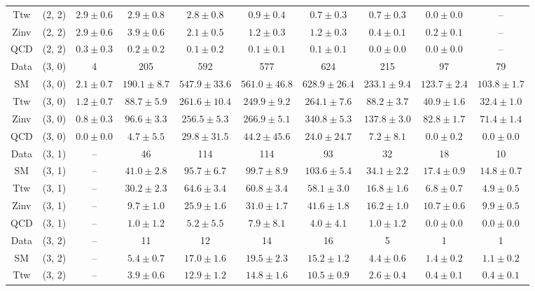 \begin{table}[h!]
{\begin{tabular}{cccccccccc}
	Ttw & (2, 2) & $2.9\pm 0.6$ & $2.9\pm 0.8$ & $2.8\pm 0.8$ & $0.9\pm 0.4$ & $0.7\pm 0.3$ & $0.7\pm 0.3$ & $0.0\pm 0.0$ & -- \\[0.5ex] 
	Zinv & (2, 2) & $2.9\pm 0.6$ & $3.9\pm 0.6$ & $2.1\pm 0.5$ & $1.2\pm 0.3$ & $1.2\pm 0.3$ & $0.4\pm 0.1$ & $0.2\pm 0.1$ & -- \\[0.5ex] 
	QCD & (2, 2) & $0.3\pm 0.3$ & $0.2\pm 0.2$ & $0.1\pm 0.2$ & $0.1\pm 0.1$ & $0.1\pm 0.1$ & $0.0\pm 0.0$ & $0.0\pm 0.0$ & -- \\[0.5ex] 
	Data & (3, 0) & 4 & 205 & 592 & 577 & 624 & 215 & 97 & 79 \\[0.5ex] 
	SM & (3, 0) & $2.1\pm 0.7$ & $190.1\pm 8.7$ & $547.9\pm 33.6$ & $561.0\pm 46.8$ & $628.9\pm 26.4$ & $233.1\pm 9.4$ & $123.7\pm 2.4$ & $103.8\pm 1.7$ \\[0.5ex] 
	Ttw & (3, 0) & $1.2\pm 0.7$ & $88.7\pm 5.9$ & $261.6\pm 10.4$ & $249.9\pm 9.2$ & $264.1\pm 7.6$ & $88.2\pm 3.7$ & $40.9\pm 1.6$ & $32.4\pm 1.0$ \\[0.5ex] 
	Zinv & (3, 0) & $0.8\pm 0.3$ & $96.6\pm 3.3$ & $256.5\pm 5.3$ & $266.9\pm 5.1$ & $340.8\pm 5.3$ & $137.8\pm 3.0$ & $82.8\pm 1.7$ & $71.4\pm 1.4$ \\[0.5ex] 
	QCD & (3, 0) & $0.0\pm 0.0$ & $4.7\pm 5.5$ & $29.8\pm 31.5$ & $44.2\pm 45.6$ & $24.0\pm 24.7$ & $7.2\pm 8.1$ & $0.0\pm 0.2$ & $0.0\pm 0.0$ \\[0.5ex] 
	Data & (3, 1) & -- & 46 & 114 & 114 & 93 & 32 & 18 & 10 \\[0.5ex] 
	SM & (3, 1) & -- & $41.0\pm 2.8$ & $95.7\pm 6.7$ & $99.7\pm 8.9$ & $103.6\pm 5.4$ & $34.1\pm 2.2$ & $17.4\pm 0.9$ & $14.8\pm 0.7$ \\[0.5ex] 
	Ttw & (3, 1) & -- & $30.2\pm 2.3$ & $64.6\pm 3.4$ & $60.8\pm 3.4$ & $58.1\pm 3.0$ & $16.8\pm 1.6$ & $6.8\pm 0.7$ & $4.9\pm 0.5$ \\[0.5ex] 
	Zinv & (3, 1) & -- & $9.7\pm 1.0$ & $25.9\pm 1.6$ & $31.0\pm 1.7$ & $41.6\pm 1.8$ & $16.2\pm 1.0$ & $10.7\pm 0.6$ & $9.9\pm 0.5$ \\[0.5ex] 
	QCD & (3, 1) & -- & $1.0\pm 1.2$ & $5.2\pm 5.5$ & $7.9\pm 8.1$ & $4.0\pm 4.1$ & $1.0\pm 1.2$ & $0.0\pm 0.0$ & $0.0\pm 0.0$ \\[0.5ex] 
	Data & (3, 2) & -- & 11 & 12 & 14 & 16 & 5 & 1 & 1 \\[0.5ex] 
	SM & (3, 2) & -- & $5.4\pm 0.7$ & $17.0\pm 1.6$ & $19.5\pm 2.3$ & $15.2\pm 1.2$ & $4.4\pm 0.6$ & $1.4\pm 0.2$ & $1.1\pm 0.2$ \\[0.5ex] 
	Ttw & (3, 2) & -- & $3.9\pm 0.6$ & $12.9\pm 1.2$ & $14.8\pm 1.6$ & $10.5\pm 0.9$ & $2.6\pm 0.4$ & $0.4\pm 0.1$ & $0.4\pm 0.1$ \\[0.5ex] 

\end{tabular}}
\end{table}
